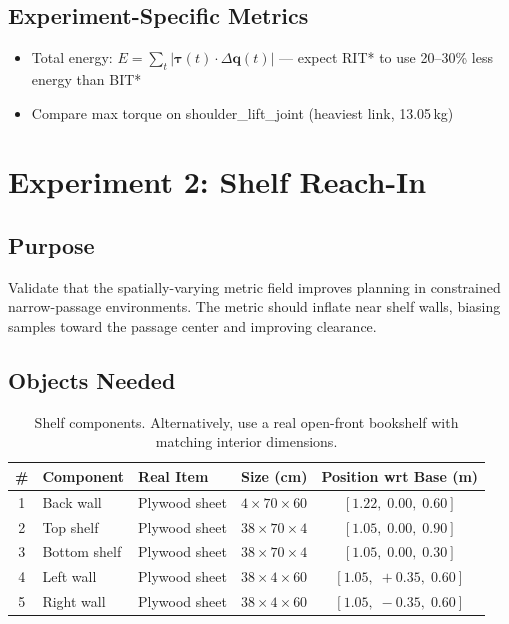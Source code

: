 \documentclass[11pt]{article}
\begin{document}
\subsection{Experiment-Specific Metrics}
\begin{itemize}[itemsep=2pt]
  \item Total energy: $E = \sum_t |\boldsymbol{\tau}(t) \cdot \Delta\mathbf{q}(t)|$ --- expect RIT* to use 20--30\% less energy than BIT*
  \item Compare max torque on shoulder\_lift\_joint (heaviest link, 13.05\,kg)
\end{itemize}


\newpage
\section{Experiment 2: Shelf Reach-In}

\subsection{Purpose}
Validate that the spatially-varying metric field improves planning in constrained narrow-passage environments. The metric should inflate near shelf walls, biasing samples toward the passage center and improving clearance.

\subsection{Objects Needed}

\begin{table}[h]
\centering
\begin{tabular}{@{}clllc@{}}
\toprule
\# & Component & Real Item & Size (cm) & Position wrt Base (m) \\
\midrule
1 & Back wall & Plywood sheet & $4 \times 70 \times 60$ & $[1.22,\; 0.00,\; 0.60]$ \\
2 & Top shelf & Plywood sheet & $38 \times 70 \times 4$ & $[1.05,\; 0.00,\; 0.90]$ \\
3 & Bottom shelf & Plywood sheet & $38 \times 70 \times 4$ & $[1.05,\; 0.00,\; 0.30]$ \\
4 & Left wall & Plywood sheet & $38 \times 4 \times 60$ & $[1.05,\; +0.35,\; 0.60]$ \\
5 & Right wall & Plywood sheet & $38 \times 4 \times 60$ & $[1.05,\; -0.35,\; 0.60]$ \\
\bottomrule
\end{tabular}
\caption{Shelf components. Alternatively, use a real open-front bookshelf with matching interior dimensions.}
\end{table}
\end{document}
